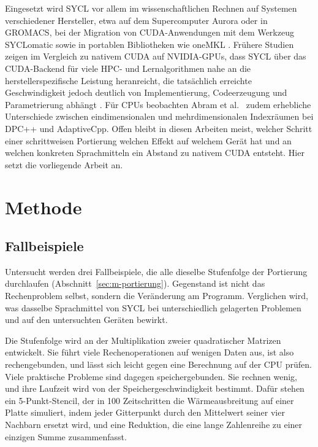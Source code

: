 \documentclass[12pt,a4paper]{article}
\begin{document}
Eingesetzt wird SYCL vor allem im wissenschaftlichen Rechnen auf Systemen
verschiedener Hersteller, etwa auf dem Supercomputer Aurora oder in GROMACS,
bei der Migration von CUDA-Anwendungen mit dem Werkzeug SYCLomatic sowie in
portablen Bibliotheken wie oneMKL \cite{reinders2023dpcpp}. Frühere Studien
zeigen im Vergleich zu nativem CUDA auf NVIDIA-GPUs, dass SYCL über das
CUDA-Backend für viele HPC- und Lernalgorithmen nahe an die
herstellerspezifische Leistung heranreicht, die tatsächlich erreichte
Geschwindigkeit jedoch deutlich von Implementierung, Codeerzeugung und
Parametrierung abhängt \cite{deakin2020sycl, breyer2022svm}. Für CPUs
beobachten Abram et al.\ \cite{abram2025sycl} zudem erhebliche Unterschiede
zwischen eindimensionalen und mehrdimensionalen Indexräumen bei DPC++ und
AdaptiveCpp. Offen bleibt in diesen Arbeiten meist, welcher Schritt einer
schrittweisen Portierung welchen Effekt auf welchem Gerät hat und an welchen
konkreten Sprachmitteln ein Abstand zu nativem CUDA entsteht. Hier setzt die
vorliegende Arbeit an.

\section{Methode}\label{sec:methode}

\subsection{Fallbeispiele}\label{sec:m-fallbeispiele}

Untersucht werden drei Fallbeispiele, die alle dieselbe Stufenfolge der
Portierung durchlaufen (Abschnitt~\ref{sec:m-portierung}). Gegenstand ist nicht
das Rechenproblem selbst, sondern die Veränderung am Programm. Verglichen
wird, was dasselbe Sprachmittel von SYCL bei unterschiedlich gelagerten Problemen
und auf den untersuchten Geräten bewirkt.

Die Stufenfolge wird an der Multiplikation zweier quadratischer Matrizen
entwickelt. Sie führt viele Rechenoperationen auf wenigen Daten aus, ist also
rechengebunden, und lässt sich leicht gegen eine Berechnung auf der CPU
prüfen. Viele praktische Probleme sind dagegen speichergebunden. Sie
rechnen wenig, und ihre Laufzeit wird von der Speichergeschwindigkeit bestimmt.
Dafür stehen ein 5-Punkt-Stencil, der in 100 Zeitschritten die Wärmeausbreitung
auf einer Platte simuliert, indem jeder Gitterpunkt durch den Mittelwert seiner
vier Nachbarn ersetzt wird, und eine Reduktion, die eine lange Zahlenreihe zu
einer einzigen Summe zusammenfasst.
\end{document}
